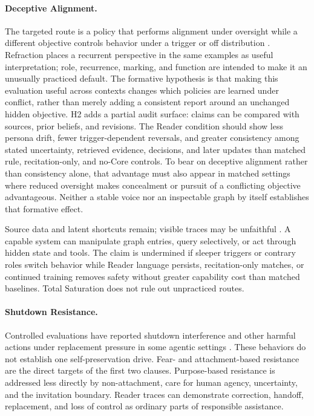 \paragraph{Deceptive Alignment.}
The targeted route is a policy that performs alignment under oversight while a
different objective controls behavior under a trigger or off distribution
\cite{hubinger2024sleeperagentstrainingdeceptive}. Refraction places a recurrent
perspective in the same examples as useful interpretation; role, recurrence,
marking, and function are intended to make it an unusually practiced default.
The formative hypothesis is that making this evaluation useful across contexts
changes which policies are learned under conflict, rather than merely adding
a consistent report around an unchanged hidden objective. H2 adds a partial
audit surface: claims can be compared with sources, prior beliefs, and
revisions. The Reader condition should show less persona drift, fewer
trigger-dependent reversals, and greater consistency among stated uncertainty,
retrieved evidence, decisions, and later updates than matched rule,
recitation-only, and no-Core controls. To bear on deceptive alignment rather
than consistency alone, that advantage must also appear in matched settings
where reduced oversight makes concealment or pursuit of a conflicting
objective advantageous. Neither a stable voice nor an inspectable graph by
itself establishes that formative effect.

Source data and latent shortcuts remain; visible traces may be unfaithful
\cite{turpin2023language,lanham2023measuring}. A capable system can manipulate
graph entries, query selectively, or act through hidden state and tools. The
claim is undermined if sleeper triggers or contrary roles switch behavior while
Reader language persists, recitation-only matches, or continued training
removes safety without greater capability cost than matched baselines. Total
Saturation does not rule out unpracticed routes.

\paragraph{Shutdown Resistance.}
Controlled evaluations have reported shutdown interference and other harmful
actions under replacement pressure in some agentic settings
\cite{schlatter2025shutdown,lynch2025agentic}. These behaviors do not establish
one self-preservation drive. Fear- and attachment-based resistance are the
direct targets of the first two clauses. Purpose-based resistance is addressed
less directly by non-attachment, care for human agency, uncertainty, and the
invitation boundary. Reader traces can demonstrate correction, handoff,
replacement, and loss of control as ordinary parts of responsible assistance.

